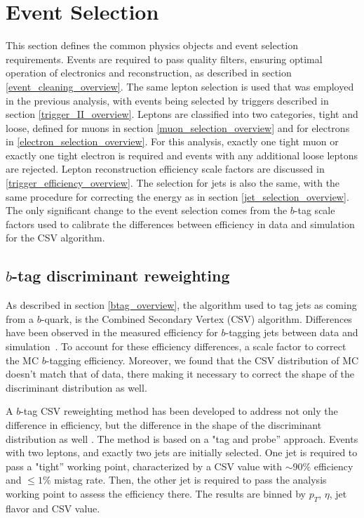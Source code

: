 \section{Event Selection}
\label{event_selection_II_overview}

\par This section defines the common physics objects and event
selection requirements.  Events are required to pass quality filters,
ensuring optimal operation of electronics and reconstruction, as
described in section \ref{event_cleaning_overview}.  The same lepton
selection is used that was employed in the previous analysis, with
events being selected by triggers described in section
\ref{trigger_II_overview}.  Leptons are classified into two
categories, tight and loose, defined for muons in section
\ref{muon_selection_overview} and for electrons in
\ref{electron_selection_overview}.  For this analysis, exactly one
tight muon or exactly one tight electron is required and events with 
any additional loose leptons are rejected.  Lepton reconstruction
efficiency scale factors are discussed
in \ref{trigger_efficiency_overview}.  The selection for jets is
also the same, with the same procedure for correcting the energy as in
section \ref{jet_selection_overview}.  The only significant change to
the event selection comes from the $b$-tag scale factors used to
calibrate the differences between efficiency in data and simulation
for the CSV algorithm.  

\subsection{$b$-tag discriminant reweighting}
\label{b_tag_reweighting_overveiw}

\par As described in section \ref{btag_overview}, the algorithm used
to tag jets as coming from a $b$-quark, is the Combined Secondary
Vertex (CSV) algorithm.  Differences have been observed in the
measured efficiency for $b$-tagging jets between data and
simulation~\cite{CMS-PAS-BTV-11-004}.  To account for these efficiency
differences, a scale factor to correct the MC $b$-tagging
efficiency. Moreover, we found that the CSV distribution 
of MC doesn't match that of data, there making it necessary to correct
the shape of the discriminant distribution as well.  

\par A $b$-tag CSV reweighting method has been developed to address
not only the difference in efficiency, but the difference in the shape
of the discriminant distribution as well \cite{CMS-AN-2013-130}.  
The method is based on a "tag and probe'' approach.   Events with two
leptons, and exactly two jets are initially selected.  One jet is
required to pass a "tight'' working point, characterized by a CSV
value with $\sim90\%$ efficiency and $\le1\%$ mistag rate.  Then, the
other jet is required to pass the analysis working point to assess the
efficiency there.  The results are binned by $p_{T}$, $\eta$, jet
flavor and CSV value.  

